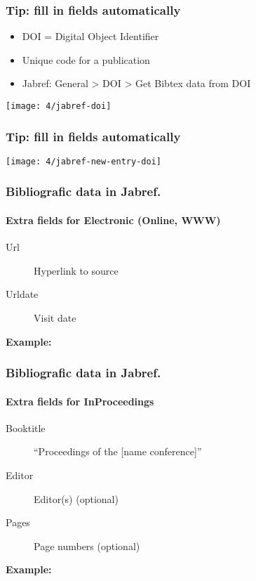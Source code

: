 \documentclass[aspectratio=169]{beamer}
\begin{document}
\begin{frame}
    \frametitle{Tip: fill in fields automatically}
    
    \begin{itemize}
        \item DOI = Digital Object Identifier
        \item Unique code for a publication
        \item Jabref: General > DOI > Get Bibtex data from DOI
    \end{itemize}
    
    \bigskip
    
    \centering
    \texttt{[image: 4/jabref-doi]}
    
\end{frame}

\begin{frame}[plain]
    \frametitle{Tip: fill in fields automatically}
    
    \centering
    \texttt{[image: 4/jabref-new-entry-doi]}
    
\end{frame}

\begin{frame}[plain]
  \frametitle{Bibliografic data in Jabref.}
  \framesubtitle{Extra fields for Electronic (Online, WWW)}

  \begin{description}
    \item[Url] Hyperlink to source
    \item[Urldate] Visit date
  \end{description}

  \bigskip

  \textbf{Example:}

  \bigskip


\end{frame}

\begin{frame}[plain]
  \frametitle{Bibliografic data in Jabref.}
  \framesubtitle{Extra fields for InProceedings}

  \begin{description}
    \item[Booktitle] ``Proceedings of the [name conference]''
    \item[Editor] Editor(s) (optional)
    \item[Pages] Page numbers (optional)
  \end{description}

  \medskip

  \textbf{Example:}

\end{frame}
\end{document}
